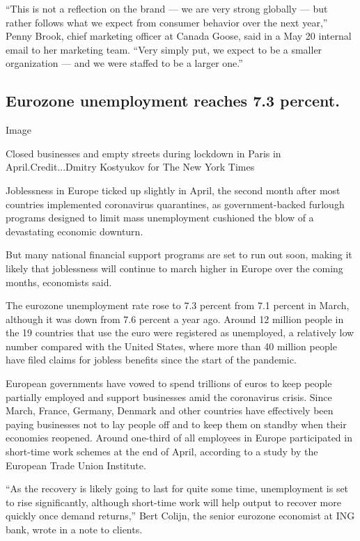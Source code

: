 ``This is not a reflection on the brand --- we are very strong globally
--- but rather follows what we expect from consumer behavior over the
next year,'' Penny Brook, chief marketing officer at Canada Goose, said
in a May 20 internal email to her marketing team. ``Very simply put, we
expect to be a smaller organization --- and we were staffed to be a
larger one.''

\hypertarget{eurozone-unemployment-reaches-73-percent}{%
\subsection{Eurozone unemployment reaches 7.3
percent.}\label{eurozone-unemployment-reaches-73-percent}}

Image

Closed businesses and empty streets during lockdown in Paris in
April.Credit...Dmitry Kostyukov for The New York Times

Joblessness in Europe ticked up slightly in April, the second month
after most countries implemented coronavirus quarantines, as
government-backed furlough programs designed to limit mass unemployment
cushioned the blow of a devastating economic downturn.

But many national financial support programs are set to run out soon,
making it likely that joblessness will continue to march higher in
Europe over the coming months, economists said.

The eurozone unemployment rate rose to 7.3 percent from 7.1 percent in
March, although it was down from 7.6 percent a year ago. Around 12
million people in the 19 countries that use the euro were registered as
unemployed, a relatively low number compared with the United States,
where more than 40 million people have filed claims for jobless benefits
since the start of the pandemic.

European governments have vowed to spend trillions of euros to keep
people partially employed and support businesses amid the coronavirus
crisis. Since March, France, Germany, Denmark and other countries have
effectively been paying businesses not to lay people off and to keep
them on standby when their economies reopened. Around one-third of all
employees in Europe participated in short-time work schemes at the end
of April, according to a study by the European Trade Union Institute.

``As the recovery is likely going to last for quite some time,
unemployment is set to rise significantly, although short-time work will
help output to recover more quickly once demand returns,'' Bert Colijn,
the senior eurozone economist at ING bank, wrote in a note to clients.

